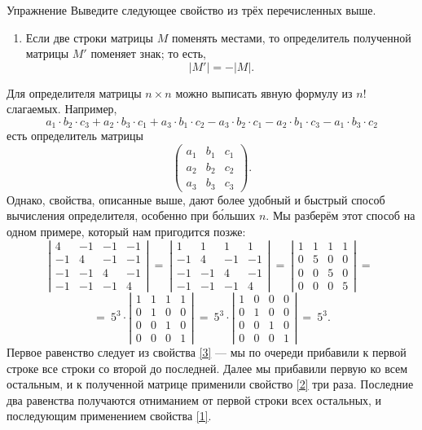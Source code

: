\documentclass{article}
\begin{document}
\begin{thm}{Упражнение}
Выведите следующее свойство из трёх перечисленных выше.
\end{thm}

\begin{enumerate}[resume]
 \item 
Если две строки матрицы $M$ поменять местами, то определитель полученной матрицы $M'$ поменяет знак; то есть,
\[|M'|=-|M|.\]
\end{enumerate}


Для определителя матрицы $n\times n$ можно выписать явную формулу из $n!$ слагаемых. 
Например, 
\[
a_1{\cdot} b_2{\cdot} c_3+a_2{\cdot} b_3{\cdot} c_1+a_3{\cdot} b_1{\cdot} c_2-a_3{\cdot} b_2{\cdot} c_1-a_2{\cdot} b_1{\cdot} c_3-a_1{\cdot} b_3{\cdot} c_2\]
есть определитель матрицы
\[\left(
\begin{matrix}
a_1&b_1&c_1
\\
a_2&b_2&c_2
\\
a_3&b_3&c_3
\end{matrix}
\right).\]
Однако, свойства, описанные выше, дают более удобный и быстрый способ вычисления определителя, особенно при б\'{о}льших $n$.
Мы разберём этот способ на одном примере, который нам пригодится позже:
\[\left|
\begin{matrix}
4&-1&-1&-1
\\
-1&4&-1&-1
\\
-1&-1&4&-1
\\
-1&-1&-1&4
\end{matrix}
\right|
\ 
=
\ 
\left|
\begin{matrix}
1&1&1&1
\\
-1&4&-1&-1
\\
-1&-1&4&-1
\\
-1&-1&-1&4
\end{matrix}
\right|
\ 
=
\ 
\left|
\begin{matrix}
1&1&1&1
\\
0&5&0&0
\\
0&0&5&0
\\
0&0&0&5
\end{matrix}
\right|
\ 
=
\ 
\]
\[
=\ 
5^3\cdot
\left|
\begin{matrix}
1&1&1&1
\\
0&1&0&0
\\
0&0&1&0
\\
0&0&0&1
\end{matrix}
\right|\ =\ 
5^3\cdot\left|
\begin{matrix}
1&0&0&0
\\
0&1&0&0
\\
0&0&1&0
\\
0&0&0&1
\end{matrix}
\right|
\ =\ 5^3.\]
Первое равенство следует из свойства \ref{3} --- мы по очереди прибавили к первой строке все строки со второй до последней. 
Далее мы прибавили первую ко всем остальным, и к полученной матрице применили свойство \ref{2} три раза.
Последние два равенства получаются отниманием от первой строки всех остальных, и последующим применением свойства \ref{1}.
\end{document}
